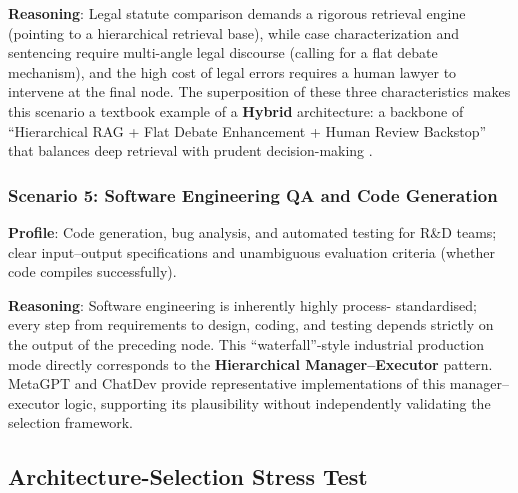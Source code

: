 \textbf{Reasoning}: Legal statute comparison demands a rigorous retrieval
engine (pointing to a hierarchical retrieval base), while case characterization
and sentencing require multi-angle legal discourse (calling for a flat debate
mechanism), and the high cost of legal errors requires a human lawyer to
intervene at the final node.
The superposition of these three characteristics makes this scenario
a textbook example of a \textbf{Hybrid} architecture: a backbone of
``Hierarchical RAG + Flat Debate Enhancement + Human Review Backstop'' that
balances deep retrieval with prudent decision-making \citep{gao2024rag_survey}.

\subsubsection{Scenario 5: Software Engineering QA and Code Generation}

\textbf{Profile}: Code generation, bug analysis, and automated testing for
R\&D teams; clear input--output specifications and unambiguous evaluation
criteria (whether code compiles successfully).

\textbf{Reasoning}: Software engineering is inherently highly process-
standardised; every step from requirements to design, coding, and testing
depends strictly on the output of the preceding node.
This ``waterfall''-style industrial production mode directly corresponds to
the \textbf{Hierarchical Manager--Executor} pattern.
MetaGPT \citep{hong2024metagpt} and ChatDev \citep{qian2023chatdev} provide
representative implementations of this manager--executor logic, supporting
its plausibility without independently validating the selection framework.

\subsection{Architecture-Selection Stress Test}
\label{sec:validation}

